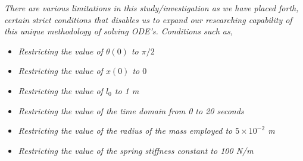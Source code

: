 \textit{There are various limitations in this study/investigation as we have placed forth, certain strict conditions that disables us to expand our researching capability of this unique methodology of solving ODE's. Conditions such as,}
        
    \begin{itemize}
        \item \textit{Restricting the value of $\theta(0)$ to $\pi/2$}
        \item \textit{Restricting the value of $x(0)$ to $0$}
        \item \textit{Restricting the value of $l_0$ to 1 m}
        \item \textit{Restricting the value of the time domain from 0 to 20 seconds}
        \item \textit{Restricting the value of the radius of the mass employed to $5\times10^{-2}$ m}
        \item \textit{Restricting the value of the spring stiffness constant to 100 N/m}
    \end{itemize}
        
        

